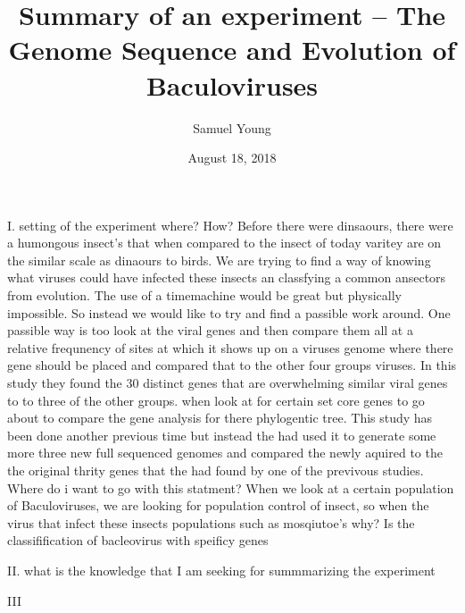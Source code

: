 \documentclass{article}[12pt,a4paper,twoside,draft]
\author{Samuel Young}
\date{August 18, 2018}
\title{Summary of an experiment -- The Genome Sequence and Evolution of Baculoviruses}
\begin{document}
\maketitle

I. setting of the experiment
   where? How? 
   Before there were dinsaours, there were a humongous insect's that when compared to the insect of today varitey are on the similar scale as dinaours to birds.  We are trying to find a way of knowing what viruses could have infected these insects an classfying a common ansectors from evolution. The use of a timemachine would be great but physically impossible. So instead we would like to try and find a passible work around. One passible way is too look at the viral genes and then compare them all at a relative frequnency of sites at which it shows up on a viruses genome where there gene should be placed and compared that to the other four groups viruses. In this study they found the 30 distinct genes that are overwhelming similar viral genes to to three of the other groups. when look at for certain set core genes to go about to compare the  gene analysis for there phylogentic tree. This study has been done another previous time but instead the had used it to generate  some more three new full sequenced genomes and compared the newly aquired to the  the original thrity genes that the had found by one of the previvous studies.     
   Where do i want to go with this statment?
   When we look at a certain population of Baculoviruses, we are looking for  population control of insect, so when the virus that infect these insects populations such as mosqiutoe's    
   why?
   Is the classifification of bacleovirus with speificy genes 

II. what is the knowledge that I am seeking for summmarizing the experiment 

III
\end{document}
